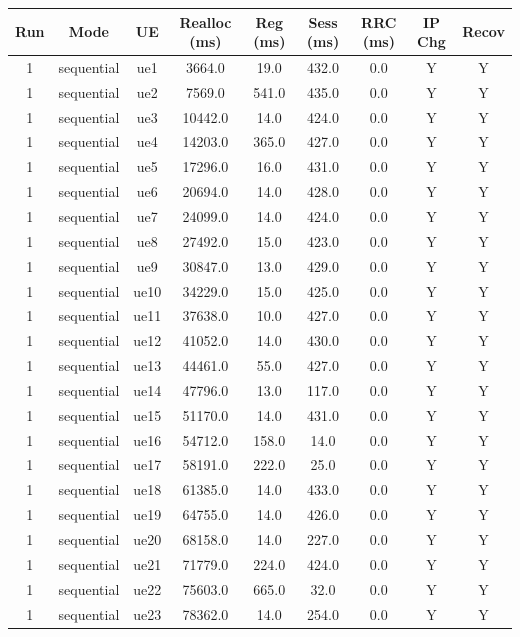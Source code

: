 \begin{table}[ht]
\centering
\begin{tabular}{|c|c|c|c|c|c|c|c|c|}
\hline
Run & Mode & UE & Realloc (ms) & Reg (ms) & Sess (ms) & RRC (ms) & IP Chg & Recov \\
\hline
1 & sequential & ue1 & 3664.0 & 19.0 & 432.0 & 0.0 & Y & Y \\
1 & sequential & ue2 & 7569.0 & 541.0 & 435.0 & 0.0 & Y & Y \\
1 & sequential & ue3 & 10442.0 & 14.0 & 424.0 & 0.0 & Y & Y \\
1 & sequential & ue4 & 14203.0 & 365.0 & 427.0 & 0.0 & Y & Y \\
1 & sequential & ue5 & 17296.0 & 16.0 & 431.0 & 0.0 & Y & Y \\
1 & sequential & ue6 & 20694.0 & 14.0 & 428.0 & 0.0 & Y & Y \\
1 & sequential & ue7 & 24099.0 & 14.0 & 424.0 & 0.0 & Y & Y \\
1 & sequential & ue8 & 27492.0 & 15.0 & 423.0 & 0.0 & Y & Y \\
1 & sequential & ue9 & 30847.0 & 13.0 & 429.0 & 0.0 & Y & Y \\
1 & sequential & ue10 & 34229.0 & 15.0 & 425.0 & 0.0 & Y & Y \\
1 & sequential & ue11 & 37638.0 & 10.0 & 427.0 & 0.0 & Y & Y \\
1 & sequential & ue12 & 41052.0 & 14.0 & 430.0 & 0.0 & Y & Y \\
1 & sequential & ue13 & 44461.0 & 55.0 & 427.0 & 0.0 & Y & Y \\
1 & sequential & ue14 & 47796.0 & 13.0 & 117.0 & 0.0 & Y & Y \\
1 & sequential & ue15 & 51170.0 & 14.0 & 431.0 & 0.0 & Y & Y \\
1 & sequential & ue16 & 54712.0 & 158.0 & 14.0 & 0.0 & Y & Y \\
1 & sequential & ue17 & 58191.0 & 222.0 & 25.0 & 0.0 & Y & Y \\
1 & sequential & ue18 & 61385.0 & 14.0 & 433.0 & 0.0 & Y & Y \\
1 & sequential & ue19 & 64755.0 & 14.0 & 426.0 & 0.0 & Y & Y \\
1 & sequential & ue20 & 68158.0 & 14.0 & 227.0 & 0.0 & Y & Y \\
1 & sequential & ue21 & 71779.0 & 224.0 & 424.0 & 0.0 & Y & Y \\
1 & sequential & ue22 & 75603.0 & 665.0 & 32.0 & 0.0 & Y & Y \\
1 & sequential & ue23 & 78362.0 & 14.0 & 254.0 & 0.0 & Y & Y \\

\end{tabular}
\end{table}
